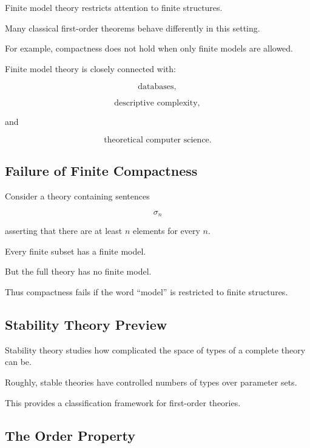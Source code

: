 Finite model theory restricts attention to finite structures.

Many classical first-order theorems behave differently in this setting.

For example, compactness does not hold when only finite models are allowed.

Finite model theory is closely connected with:

\[
\boxed{
\text{databases},
}
\]

\[
\boxed{
\text{descriptive complexity},
}
\]

and

\[
\boxed{
\text{theoretical computer science}.
}
\]

\subsection{Failure of Finite Compactness}
\label{subsec:finite-compactness-failure}

Consider a theory containing sentences

\[
\sigma_n
\]

asserting that there are at least \(n\) elements for every \(n\).

Every finite subset has a finite model.

But the full theory has no finite model.

Thus compactness fails if the word ``model'' is restricted to finite
structures.

\subsection{Stability Theory Preview}
\label{subsec:stability-theory-preview}

Stability theory studies how complicated the space of types of a complete
theory can be.

Roughly, stable theories have controlled numbers of types over parameter
sets.

This provides a classification framework for first-order theories.

\subsection{The Order Property}
\label{subsec:model-theoretic-order-property}

